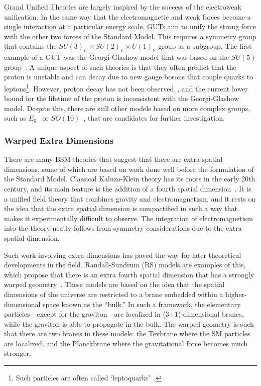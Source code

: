 Grand Unified Theories are largely inspired by the success of the electroweak unification.
In the same way that the electromagnetic and weak forces become a single interaction at a particular energy scale, GUTs aim to unify the strong force with the other two forces of the Standard Model.
This requires a symmetry group that contains the $SU(3)_C\times SU(2)_L\times U(1)_Y$ group as a subgroup.
The first example of a GUT was the Georgi-Glashow model that was based on the $SU(5)$ group~\cite{PhysRevLett.32.438}.
A unique aspect of such theories is that they often predict that the proton is unstable and can decay due to new gauge bosons that couple quarks to leptons\footnote{Such particles are often called `leptoquarks'~\cite{Diaz_2017}.}.
However, proton decay has not been observed~\cite{PhysRevLett.81.3319}, and the current lower bound for the lifetime of the proton is inconsistent with the Georgi-Glashow model.
Despite this, there are still other models based on more complex groups, such as $E_6$~\cite{Hewett1989193} or $SO(10)$~\cite{Cveti__1997}, that are candidates for further investigation.

\subsubsection{Warped Extra Dimensions}

There are many BSM theories that suggest that there are extra spatial dimensions, some of which are based on work done well before the formulation of the Standard Model.
Classical Kaluza-Klein theory has its roots in the early 20th century, and its main feature is the addition of a fourth spatial dimension~\cite{1921spaw966K}.
It is a unified field theory that combines gravity and electromagnetism, and it rests on the idea that the extra spatial dimension is compactified in such a way that makes it experimentally difficult to observe.
The integration of electromagnetism into the theory neatly follows from symmetry considerations due to the extra spatial dimension.

Such work involving extra dimensions has paved the way for later theoretical developments in the field.
Randall-Sundrum (RS) models are examples of this, which propose that there is an extra fourth spatial dimension that has a strongly warped geometry~\cite{PhysRevLett.83.4690}.
These models are based on the idea that the spatial dimensions of the universe are restricted to a brane embedded within a higher-dimensional space known as the ``bulk.''
In such a framework, the elementary particles---except for the graviton---are localized in (3+1)-dimensional branes, while the graviton is able to propagate in the bulk.
The warped geometry is such that there are two branes in these models: the Tevbrane where the SM particles are localized, and the Planckbrane where the gravitational force becomes much stronger.

